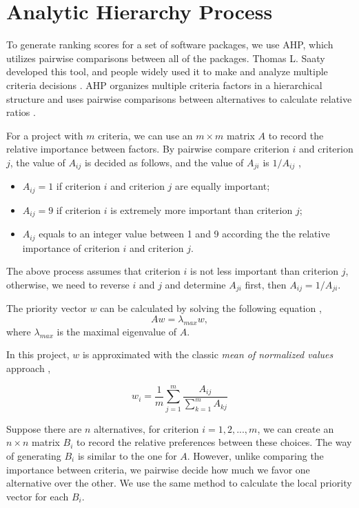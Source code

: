 \section{Analytic Hierarchy Process}
\label{sec_AHP}
To generate ranking scores for a set of software packages, we use AHP, which utilizes pairwise comparisons between all of the packages. Thomas L. Saaty developed this tool, and people widely used it to make and analyze multiple criteria decisions \cite{VaidyaEtAl2006}. AHP organizes multiple criteria factors in a hierarchical structure and uses pairwise comparisons between alternatives to calculate relative ratios \cite{Saaty1990}.

For a project with $ m $ criteria, we can use an $m\times m$ matrix $A$ to record the relative importance between factors. By pairwise compare criterion $i$ and criterion $j$, the value of $A_{ij}$ is decided as follows, and the value of $A_{ji}$ is $1/A_{ij}$ \cite{Saaty1990},
\begin{itemize}
	\item $A_{ij} = 1$ if criterion $i$ and criterion $j$ are equally important;
	\item $A_{ij} = 9$ if criterion $i$ is extremely more important than criterion $j$;
	\item $A_{ij}$ equals to an integer value between 1 and 9 according the the relative importance of criterion $i$ and criterion $j$.
\end{itemize}

The above process assumes that criterion $i$ is not less important than criterion $j$, otherwise, we need to reverse $i$ and $j$ and determine $A_{ji}$ first, then $A_{ij} = 1/A_{ji}$.

The priority vector $w$ can be calculated by solving the following equation \cite{Saaty1990}, \begin{equation}
Aw = \lambda_{max}w,
\end{equation}
where $\lambda_{max}$ is the maximal eigenvalue of $A$.

In this project, $w$ is approximated with the classic \textit{mean of normalized values} approach \cite{AlessioEtAl2006},

\begin{equation}
w_i = \frac{1}{m}\sum_{j=1}^{m}\frac{A_{ij}}{\sum_{k=1}^{m}A_{kj}}
\end{equation}

Suppose there are $n$ alternatives, for criterion $i = 1, 2, ... , m$, we can create an $n\times n$ matrix $B_i$ to record the relative preferences between these choices. The way of generating $B_i$ is similar to the one for $A$. However, unlike comparing the importance between criteria, we pairwise decide how much we favor one alternative over the other. We use the same method to calculate the local priority vector for each $B_i$.

